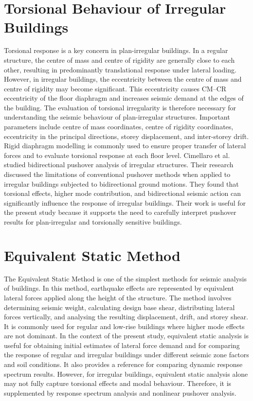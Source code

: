 \section{Torsional Behaviour of Irregular Buildings}
Torsional response is a key concern in plan-irregular buildings. In a regular structure, the centre of mass and centre of rigidity are generally close to each other, resulting in predominantly translational response under lateral loading. However, in irregular buildings, the eccentricity between the centre of mass and centre of rigidity may become significant. This eccentricity causes CM--CR eccentricity of the floor diaphragm and increases seismic demand at the edges of the building.
The evaluation of torsional irregularity is therefore necessary for understanding the seismic behaviour of plan-irregular structures. Important parameters include centre of mass coordinates, centre of rigidity coordinates, eccentricity in the principal directions, storey displacement, and inter-storey drift. Rigid diaphragm modelling is commonly used to ensure proper transfer of lateral forces and to evaluate torsional response at each floor level.
Cimellaro et al. \cite{cimellaro2014bidirectional} studied bidirectional pushover analysis of irregular structures. Their research discussed the limitations of conventional pushover methods when applied to irregular buildings subjected to bidirectional ground motions. They found that torsional effects, higher mode contribution, and bidirectional seismic action can significantly influence the response of irregular buildings. Their work is useful for the present study because it supports the need to carefully interpret pushover results for plan-irregular and torsionally sensitive buildings.
\section{Equivalent Static Method}
The Equivalent Static Method is one of the simplest methods for seismic analysis of buildings. In this method, earthquake effects are represented by equivalent lateral forces applied along the height of the structure. The method involves determining seismic weight, calculating design base shear, distributing lateral forces vertically, and analysing the resulting displacement, drift, and storey shear. It is commonly used for regular and low-rise buildings where higher mode effects are not dominant.
In the context of the present study, equivalent static analysis is useful for obtaining initial estimates of lateral force demand and for comparing the response of regular and irregular buildings under different seismic zone factors and soil conditions. It also provides a reference for comparing dynamic response spectrum results. However, for irregular buildings, equivalent static analysis alone may not fully capture torsional effects and modal behaviour. Therefore, it is supplemented by response spectrum analysis and nonlinear pushover analysis.

